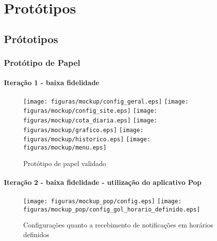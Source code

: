 \part[Protótipos]{Protótipos}

\chapter[Prótotipos]{Prótotipos}

\section[Protótipo de Papel]{Protótipo de Papel}
	\subsection{Iteração 1 - baixa fidelidade}

		\begin{figure}[h]
			\centering
				\texttt{[image: figuras/mockup/config\_geral.eps]}
				\texttt{[image: figuras/mockup/config\_site.eps]}
				\texttt{[image: figuras/mockup/cota\_diaria.eps]}
				\texttt{[image: figuras/mockup/grafico.eps]}
				\texttt{[image: figuras/mockup/historico.eps]}
				\texttt{[image: figuras/mockup/menu.eps]}
			\caption{Protótipo de papel validado}
			\label{fig03}
		\end{figure}

	\subsection{Iteração 2 - baixa fidelidade - utilização do aplicativo Pop}

		\begin{figure}[h]
			\centering
				\texttt{[image: figuras/mockup\_pop/config.eps]}
				\texttt{[image: figuras/mockup\_pop/config\_gol\_horario\_definido.eps]}
			\caption{Configurações quanto a recebimento de notificações em horários definidos}
			\label{fig:}
		\end{figure}


